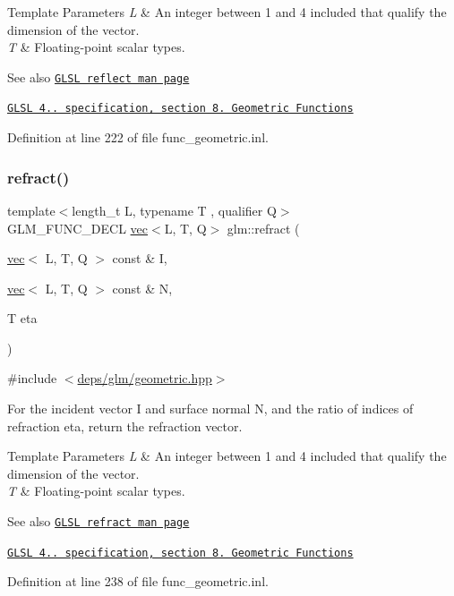 \begin{DoxyTemplParams}{Template Parameters}
{\em L} & An integer between 1 and 4 included that qualify the dimension of the vector. \\
\hline
{\em T} & Floating-\/point scalar types.\\
\hline
\end{DoxyTemplParams}
\begin{DoxySeeAlso}{See also}
\href{http://www.opengl.org/sdk/docs/manglsl/xhtml/reflect.xml}{\tt G\+L\+SL reflect man page} 

\href{http://www.opengl.org/registry/doc/GLSLangSpec.4.20.8.pdf}{\tt G\+L\+SL 4.. specification, section 8. Geometric Functions} 
\end{DoxySeeAlso}


Definition at line 222 of file func\+\_\+geometric.\+inl.

\mbox{\label{group__core__func__geometric_ga01da3dff9e2ef6b9d4915c3047e22b74}} 
\subsubsection{\texorpdfstring{refract()}{refract()}}
{\footnotesize\ttfamily template$<$length\+\_\+t L, typename T , qualifier Q$>$ \\
G\+L\+M\+\_\+\+F\+U\+N\+C\+\_\+\+D\+E\+CL \hyperlink{structglm_1_1vec}{vec}$<$L, T, Q$>$ glm\+::refract (\begin{DoxyParamCaption}\item[{\hyperlink{structglm_1_1vec}{vec}$<$ L, T, Q $>$ const \&}]{I,  }\item[{\hyperlink{structglm_1_1vec}{vec}$<$ L, T, Q $>$ const \&}]{N,  }\item[{T}]{eta }\end{DoxyParamCaption})}



{\ttfamily \#include $<$\hyperlink{geometric_8hpp}{deps/glm/geometric.\+hpp}$>$}

For the incident vector I and surface normal N, and the ratio of indices of refraction eta, return the refraction vector.


\begin{DoxyTemplParams}{Template Parameters}
{\em L} & An integer between 1 and 4 included that qualify the dimension of the vector. \\
\hline
{\em T} & Floating-\/point scalar types.\\
\hline
\end{DoxyTemplParams}
\begin{DoxySeeAlso}{See also}
\href{http://www.opengl.org/sdk/docs/manglsl/xhtml/refract.xml}{\tt G\+L\+SL refract man page} 

\href{http://www.opengl.org/registry/doc/GLSLangSpec.4.20.8.pdf}{\tt G\+L\+SL 4.. specification, section 8. Geometric Functions} 
\end{DoxySeeAlso}


Definition at line 238 of file func\+\_\+geometric.\+inl.

